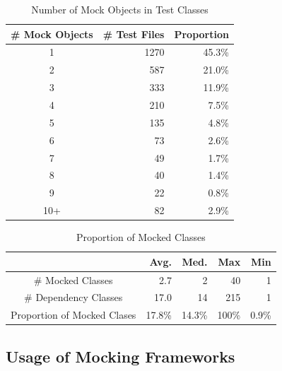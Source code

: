 \begin{table}
\caption{Number of Mock Objects in Test Classes}


\label{table:num}
\centering
\begin{tabular}{|c|r|r|}
\hline
\# Mock Objects & \# Test Files & Proportion\\
\hline
1&1270 & 45.3\%\\
2&587 & 21.0\%\\
3&333 & 11.9\%\\
4&210 & 7.5\%\\
5&135 & 4.8\%\\
6&73 & 2.6\%\\
7&49 & 1.7\%\\
8&40 & 1.4\%\\
9&22 & 0.8\%\\
10+&82 & 2.9\%\\
\hline
\end{tabular}

\end{table}


\begin{table}
\caption{Proportion of Mocked Classes}

\label{table:prop}
\centering
\begin{tabular}{|c|r|r|r|r|}
\hline
&Avg. & Med. & Max & Min\\
\hline
\# Mocked Classes &2.7&2&40&1\\
\# Dependency Classes &17.0&14&215&1\\
Proportion of Mocked Clases &17.8\%&14.3\%&100\%&0.9\%\\
\hline
\end{tabular}

\end{table}


\subsection{Usage of Mocking Frameworks}
\label{subsec:usage}


